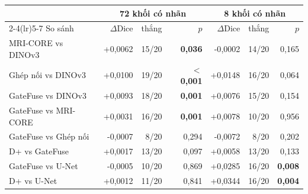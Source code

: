 \begin{tabular}{lrrrrrr}
\toprule
 & \multicolumn{3}{c}{72 khối có nhãn} & \multicolumn{3}{c}{8 khối có nhãn}\\
\cmidrule(lr){2-4}\cmidrule(lr){5-7}
So sánh & $\Delta$Dice & thắng & $p$ & $\Delta$Dice & thắng & $p$\\
\midrule
MRI-CORE vs DINOv3 & +0{,}0062 & 15/20 & \textbf{0{,}036} & -0{,}0002 & 14/20 & 0{,}165\\
Ghép nối vs DINOv3 & +0{,}0100 & 19/20 & \textbf{$<$0{,}001} & +0{,}0148 & 16/20 & 0{,}064\\
GateFuse vs DINOv3 & +0{,}0093 & 18/20 & \textbf{0{,}001} & +0{,}0076 & 15/20 & 0{,}154\\
GateFuse vs MRI-CORE & +0{,}0031 & 16/20 & \textbf{0{,}001} & +0{,}0078 & 10/20 & 0{,}956\\
GateFuse vs Ghép nối & -0{,}0007 & 8/20 & 0{,}294 & -0{,}0072 & 8/20 & 0{,}202\\
D+ vs GateFuse & +0{,}0017 & 13/20 & 0{,}097 & +0{,}0058 & 13/20 & 0{,}133\\
GateFuse vs U-Net & -0{,}0005 & 10/20 & 0{,}869 & +0{,}0285 & 16/20 & \textbf{0{,}008}\\
D+ vs U-Net & +0{,}0012 & 11/20 & 0{,}841 & +0{,}0344 & 16/20 & \textbf{0{,}004}\\
\bottomrule
\end{tabular}